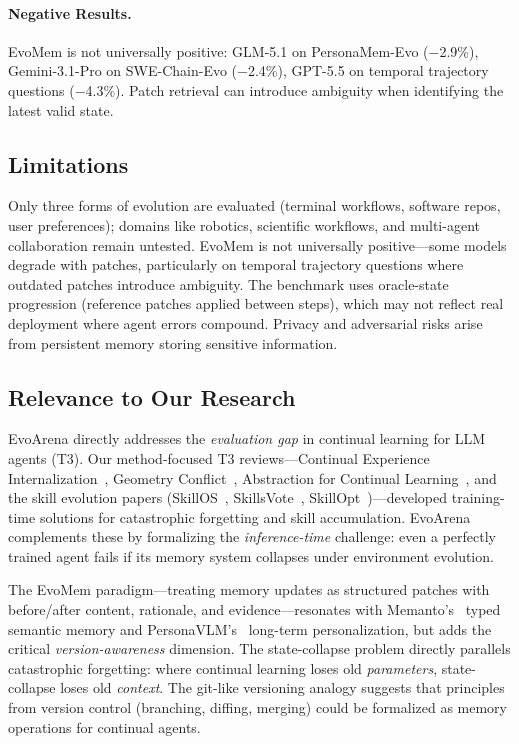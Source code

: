 \documentclass[11pt,a4paper]{article}
\begin{document}
\paragraph{Negative Results.} EvoMem is not universally positive: GLM-5.1 on PersonaMem-Evo ($-$2.9\%), Gemini-3.1-Pro on SWE-Chain-Evo ($-$2.4\%), GPT-5.5 on temporal trajectory questions ($-$4.3\%). Patch retrieval can introduce ambiguity when identifying the latest valid state.

\subsection{Limitations}

Only three forms of evolution are evaluated (terminal workflows, software repos, user preferences); domains like robotics, scientific workflows, and multi-agent collaboration remain untested. EvoMem is not universally positive---some models degrade with patches, particularly on temporal trajectory questions where outdated patches introduce ambiguity. The benchmark uses oracle-state progression (reference patches applied between steps), which may not reflect real deployment where agent errors compound. Privacy and adversarial risks arise from persistent memory storing sensitive information.

\subsection{Relevance to Our Research}

EvoArena directly addresses the \emph{evaluation gap} in continual learning for LLM agents (T3). Our method-focused T3 reviews---Continual Experience Internalization~\cite{liu2026continual}, Geometry Conflict~\cite{wu2026geometry}, Abstraction for Continual Learning~\cite{qian2026abstraction}, and the skill evolution papers (SkillOS~\cite{chen2026skillos}, SkillsVote~\cite{wang2026skillsvote}, SkillOpt~\cite{li2026skillopt})---developed training-time solutions for catastrophic forgetting and skill accumulation. EvoArena complements these by formalizing the \emph{inference-time} challenge: even a perfectly trained agent fails if its memory system collapses under environment evolution.

The EvoMem paradigm---treating memory updates as structured patches with before/after content, rationale, and evidence---resonates with Memanto's~\cite{xu2026memanto} typed semantic memory and PersonaVLM's~\cite{chen2026personavlm} long-term personalization, but adds the critical \emph{version-awareness} dimension. The state-collapse problem directly parallels catastrophic forgetting: where continual learning loses old \emph{parameters}, state-collapse loses old \emph{context}. The git-like versioning analogy suggests that principles from version control (branching, diffing, merging) could be formalized as memory operations for continual agents.
\end{document}
